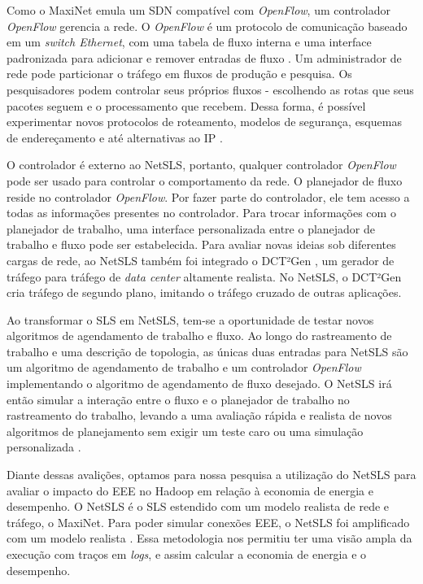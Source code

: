 Como o MaxiNet emula um SDN compatível com \emph{OpenFlow}, um controlador \emph{OpenFlow} gerencia a rede. O \emph{OpenFlow} é um protocolo de comunicação baseado em um \emph{switch Ethernet}, com uma tabela de fluxo interna e uma interface padronizada para adicionar e remover entradas de fluxo \cite{mckeown2008openflow}. Um administrador de rede pode particionar o tráfego em fluxos de produção e pesquisa. Os pesquisadores podem controlar seus próprios fluxos - escolhendo as rotas que seus pacotes seguem e o processamento que recebem. Dessa forma, é possível experimentar novos protocolos de roteamento, modelos de segurança, esquemas de endereçamento e até alternativas ao IP \cite{mckeown2008openflow}.

O controlador é externo ao NetSLS, portanto, qualquer controlador \emph{OpenFlow} pode ser usado para controlar o comportamento da rede. O planejador de fluxo reside no controlador \emph{OpenFlow}. Por fazer parte do controlador, ele tem acesso a todas as informações presentes no controlador. Para trocar informações com o planejador de trabalho, uma interface personalizada entre o planejador de trabalho e fluxo pode ser estabelecida. Para avaliar novas ideias sob diferentes cargas de rede, ao NetSLS também foi integrado o DCT²Gen \cite{wette2014dct}, um gerador de tráfego para tráfego de \emph{data center} altamente realista. No NetSLS, o DCT²Gen cria tráfego de segundo plano, imitando o tráfego cruzado de outras aplicações.

Ao transformar o SLS em NetSLS, tem-se a oportunidade de testar novos algoritmos de agendamento de trabalho e fluxo. Ao longo do rastreamento de trabalho e uma descrição de topologia, as únicas duas entradas para NetSLS são um algoritmo de agendamento de trabalho e um controlador \emph{OpenFlow} implementando o algoritmo de agendamento de fluxo desejado. O NetSLS irá então simular a interação entre o fluxo e o planejador de trabalho no rastreamento do trabalho, levando a uma avaliação rápida e realista de novos algoritmos de planejamento sem exigir um teste caro ou uma simulação personalizada \cite{wette2015extending}.

Diante dessas avalições, optamos para nossa pesquisa a utilização do NetSLS para avaliar o impacto do EEE no Hadoop em relação à economia de energia e desempenho. O NetSLS é o SLS estendido com um modelo realista de rede e tráfego, o MaxiNet. Para poder simular conexões EEE, o NetSLS foi amplificado com um modelo realista \cite{reviriego2011using}. Essa metodologia nos permitiu ter uma visão ampla da execução com traços em \emph{logs}, e assim calcular a economia de energia e o desempenho.

